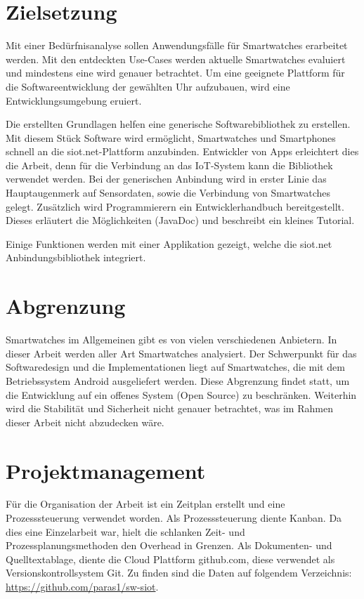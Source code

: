 \section{Zielsetzung}
Mit einer Bedürfnisanalyse sollen Anwendungsfälle für Smartwatches erarbeitet werden. Mit den entdeckten Use-Cases werden aktuelle Smartwatches evaluiert und mindestens eine wird genauer betrachtet. Um eine geeignete Plattform für die Softwareentwicklung der gewählten Uhr aufzubauen, wird eine Entwicklungsumgebung eruiert.

Die erstellten Grundlagen helfen eine generische Softwarebibliothek zu erstellen. Mit diesem Stück Software wird ermöglicht, Smartwatches und Smartphones schnell an die siot.net-Plattform anzubinden. Entwickler von Apps erleichtert dies die Arbeit, denn für die Verbindung an das \gls{IoT}-System kann die Bibliothek verwendet werden. Bei der generischen Anbindung wird in erster Linie das Hauptaugenmerk auf Sensordaten, sowie die Verbindung von Smartwatches gelegt. Zusätzlich wird Programmierern ein Entwicklerhandbuch bereitgestellt. Dieses erläutert die Möglichkeiten (JavaDoc) und beschreibt ein kleines Tutorial.

Einige Funktionen werden mit einer Applikation gezeigt, welche die siot.net Anbindungsbibliothek integriert.

\section{Abgrenzung}
Smartwatches im Allgemeinen gibt es von vielen verschiedenen Anbietern. In dieser Arbeit werden aller Art Smartwatches analysiert. Der Schwerpunkt für das Softwaredesign und die Implementationen liegt auf Smartwatches, die mit dem Betriebssystem Android ausgeliefert werden. Diese Abgrenzung findet statt, um die Entwicklung auf ein offenes System (Open Source) zu beschränken. Weiterhin wird die Stabilität und Sicherheit nicht genauer betrachtet, was im Rahmen dieser Arbeit nicht abzudecken wäre.

\section{Projektmanagement}
Für die Organisation der Arbeit ist ein Zeitplan erstellt und eine Prozesssteuerung verwendet worden. Als Prozesssteuerung diente Kanban. Da dies eine Einzelarbeit war, hielt die schlanken Zeit- und Prozessplanungsmethoden den Overhead in Grenzen. Als Dokumenten- und Quelltextablage, diente die Cloud Plattform github.com, diese verwendet als Versionskontrollsystem Git. Zu finden sind die Daten auf folgendem Verzeichnis: \url{https://github.com/paras1/sw-siot}.

